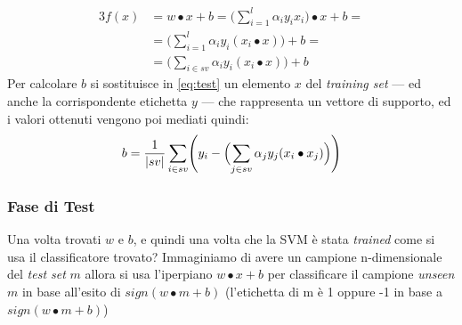 \begin{alignat}{3}
f(x)&= w \bullet x +b = \Biggl(\sum_{i=1}^{l}\alpha_{i}y_{i}x_i\Biggl) \bullet x +b = \nonumber\\
&=\Biggl(\sum_{i=1}^{l}\alpha_{i}y_{i}(x_i \bullet x)\Biggl) +b =\nonumber\\
&= \Biggl(\sum_{i \in sv}^{}\alpha_{i}y_{i}(x_i \bullet x)\Biggl) +b \label{eq:test}
\end{alignat} 
Per calcolare $b$ si sostituisce in \ref{eq:test} un elemento $x$ del \textit{training set} --- ed anche la corrispondente etichetta $y$ --- che rappresenta un vettore di supporto, ed i valori ottenuti vengono poi mediati quindi:
\begin{equation}
\label{eq:bhard}
b = \frac{1}{\lvert sv\rvert} \sum_{i \in sv}^{}\Biggl(y_i - \Bigl(\sum_{j \in sv}^{}\alpha_{j}y_{j}(x_i \bullet x_j)\Bigl)\Biggl)
\end{equation}

\subsubsection{Fase di Test}
Una volta trovati $w$ e $b$, e quindi una volta che la \ac{SVM} è stata \textit{trained} come si usa il classificatore trovato? Immaginiamo di avere un campione n-dimensionale del \textit{test set} $m$ allora si usa l'iperpiano $w \bullet x +b$ per classificare il campione \emph{unseen} $m$ in base all'esito di $sign(w \bullet m + b)$ (l'etichetta di m è 1 oppure -1 in base a $sign(w \bullet m + b)$)

